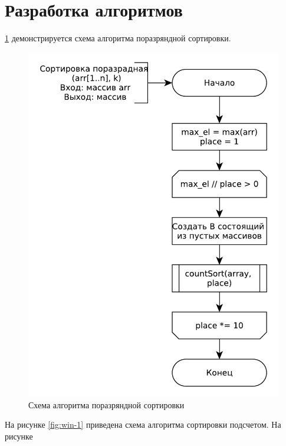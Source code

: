 \section{Разработка алгоритмов}

\ref{fig:win-2} демонстрируется схема алгоритма поразряндной сортировки.

\begin{figure}[ht!]
	\centering
	\includegraphics[width=1\linewidth]{assets/range.pdf}
	\caption{Схема алгоритма поразряндной сортировки}
	\label{fig:win-2}
\end{figure}

На рисунке \ref{fig:win-1} приведена схема алгоритма сортировки подсчетом. 
На рисунке  


